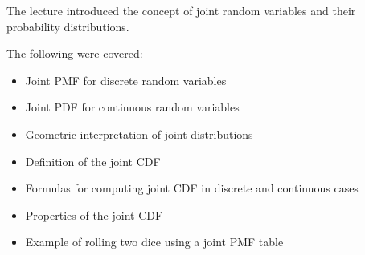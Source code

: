 \documentclass[12pt]{article}
\begin{document}
The lecture introduced the concept of joint random variables and their probability distributions.

The following were covered:

\begin{itemize}
\item Joint PMF for discrete random variables
\item Joint PDF for continuous random variables
\item Geometric interpretation of joint distributions
\item Definition of the joint CDF
\item Formulas for computing joint CDF in discrete and continuous cases
\item Properties of the joint CDF
\item Example of rolling two dice using a joint PMF table
\end{itemize}
\end{document}
